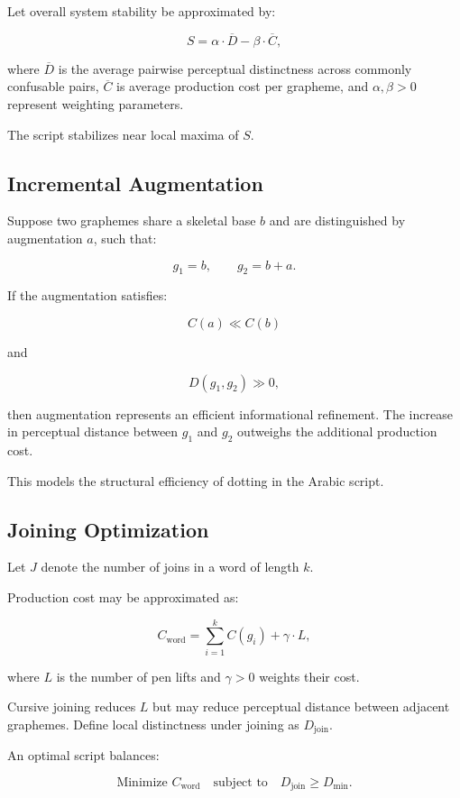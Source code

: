 \documentclass[11pt]{article}
\begin{document}
Let overall system stability be approximated by:

\[
S = \alpha \cdot \overline{D} - \beta \cdot \overline{C},
\]

where $\overline{D}$ is the average pairwise perceptual distinctness across commonly confusable pairs, $\overline{C}$ is average production cost per grapheme, and $\alpha, \beta > 0$ represent weighting parameters.

The script stabilizes near local maxima of $S$.

\subsection{Incremental Augmentation}

Suppose two graphemes share a skeletal base $b$ and are distinguished by augmentation $a$, such that:

\[
g_1 = b, \qquad g_2 = b + a.
\]

If the augmentation satisfies:

\[
C(a) \ll C(b)
\]

and

\[
D(g_1, g_2) \gg 0,
\]

then augmentation represents an efficient informational refinement. The increase in perceptual distance between $g_1$ and $g_2$ outweighs the additional production cost.

This models the structural efficiency of dotting in the Arabic script.

\subsection{Joining Optimization}

Let $J$ denote the number of joins in a word of length $k$.

Production cost may be approximated as:

\[
C_{\text{word}} = \sum_{i=1}^{k} C(g_i) + \gamma \cdot L,
\]

where $L$ is the number of pen lifts and $\gamma > 0$ weights their cost.

Cursive joining reduces $L$ but may reduce perceptual distance between adjacent graphemes. Define local distinctness under joining as $D_{\text{join}}$.

An optimal script balances:

\[
\text{Minimize } C_{\text{word}} \quad \text{subject to} \quad D_{\text{join}} \geq D_{\text{min}}.
\]
\end{document}
